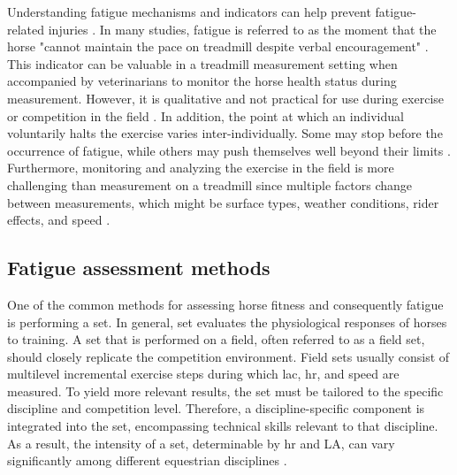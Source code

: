 Understanding fatigue mechanisms and indicators can help prevent fatigue-related injuries \cite{Takahashi2018ElectromyographicExercise}. In many studies, fatigue is referred to as the moment that the horse "cannot maintain the pace on treadmill despite verbal encouragement" \cite{Colborne2001ElectromyographicStudy.,Warren1999TheFatigue,Takahashi2020DoHorses,Curtis2006ObservationsRacehorses,Kusano2007RelativeHorses,Bayly2019EffectExercise,wickler_2006_stride,articlefer,Bowers1999InfluenceRacehorses.,Savage2005EffectsThoroughbreds,Jose-Cunilleras2006CardiacRacehorses,Buhl2018EffectTrotters}. This indicator can be valuable in a treadmill measurement setting when accompanied by veterinarians to monitor the horse health status during measurement. However, it is qualitative and not practical for use during exercise or competition in the field \cite{munsters_2014_exercise}. In addition, the point at which an individual voluntarily halts the exercise varies inter-individually. Some may stop before the occurrence of fatigue, while others may push themselves well beyond their limits \cite{Baron511}. Furthermore, monitoring and analyzing the exercise in the field is more challenging than measurement on a treadmill since multiple factors change between measurements, which might be surface types, weather conditions, rider effects, and speed \cite{munsters_2014_exercise,darbandi_2022_a}. 

\subsection{Fatigue assessment methods}

One of the common methods for assessing horse fitness and consequently fatigue is performing a \gls{set}. In general, \gls{set} evaluates the physiological responses of horses to training. A \gls{set} that is performed on a field, often referred to as a field \gls{set}, should closely replicate the competition environment. Field \gls{set}s usually consist of multilevel incremental exercise steps during which \gls{lac}, \gls{hr}, and speed are measured. To yield more relevant results, the \gls{set} must be tailored to the specific discipline and competition level. Therefore, a discipline-specific component is integrated into the \gls{set}, encompassing technical skills relevant to that discipline. As a result, the intensity of a \gls{set}, determinable by \gls{hr} and LA, can vary significantly among different equestrian disciplines \cite{munsters_2014_exercise,ETO2004139,Piccione2010BloodHorses}.

